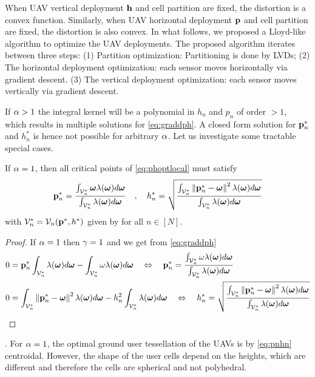 \documentclass[smallabstract,smallcaptions]{dccpaper}
\newenvironment{remark}{\par\vspace{1.5ex}\noindent{\em Remark\/}.}{\par\vspace{1.5ex}}
\newcommand{\df}{\ensuremath{\lam}}         %
\newcommand{\bP}{\ensuremath{\vp}}          %
\newcommand{\bH}{\ensuremath{\vh}}          %
\newcommand{\Vor}{\ensuremath{\mathcal{V}}}         %
\begin{document}
%
When UAV vertical deployment $\bH$ and cell partition are fixed, the distortion is a convex function.  Similarly, when
UAV horizontal deployment $\bP$ and cell partition are fixed, the distortion is also convex.  In what follows,
we proposed a Lloyd-like algorithm to optimize the UAV deployments.  The proposed algorithm iterates between three
steps: (1) Partition optimization: Partitioning is done by LVDs; (2) The horizontal deployment optimization: each sensor
moves horizontally via gradient descent.  (3) The vertical deployment optimization: each sensor moves vertically via
gradient descent.

If $\alpha>1$ the integral kernel will be a polynomial in $h_n$ and $p_n$ of order $>1$, which results in multiple
solutions for \eqref{eq:graddph}. A closed form solution for ${\mathbf p}_n^*$ and $h_n^*$ is hence not possible for arbitrary
$\alpha$. Let us investigate some tractable special cases.   
%
\begin{corollary}\label{cor:alponedifheight}
  If $\alpha=1$, then all critical points  of \eqref{eq:phoptlocal} must satisfy 
  \begin{align}
    \vp_n^* = \frac{\int_{\Vor^*_n} \vome \df(\vome)d\vome}{\int_{\Vor^*_n} \df(\vome)d\vome}\quad,\quad 
    h_n^* = \sqrt{\frac{\int_{\Vor^*_n}\Norm{\vp_n^*-\vome}^2 \df(\vome)d\vome}{\int_{\Vor^*_n} \df(\vome)d\vome}}\label{eq:pnhn}
  \end{align}
  with  $\Vor_n^*=\Vor_n(\vp^*,h^*)$ given by  for all $n\in[N]$.
\end{corollary}
%
\begin{proof}
  If $\alpha=1$ then $\gamma=1$ and we get from \eqref{eq:graddph}
  \begin{align}
    &0= \vp_n^*\int_{\Vor^*_n} \df(\vome)d\vome- \int_{\Vor_n^*} \ome\df(\vome)d\vome
   \quad \LRA\quad 
    \vp_n^*= \frac{\int_{\Vor_n^*} \ome\df(\vome)d\vome}{\int_{\Vor^*_n} \df(\vome)d\vome }\\
    &0= \int_{\Vor_n^*} \Norm{\vp_n^*-\vome}^2 \df(\vome) d\vome - h_n^2\int_{\Vor^*_n}  \df(\vome)d \vome
   \quad \LRA \quad
    h_n^*= \sqrt{\frac{\int_{\Vor_n^*} \Norm{\vp_n^*-\vome}^2\df(\vome)d\vome}{\int_{\Vor^*_n}  \df(\vome)d\vome }}
  \end{align}
\end{proof}
%
\begin{remark}
  For $\alpha=1$, the optimal ground user tessellation of the UAVs is by \eqref{eq:pnhn} centroidal. However, the shape of
  the user cells depend on the heights, which are different and therefore the cells are spherical and not polyhedral. 
\end{remark}
\end{document}
